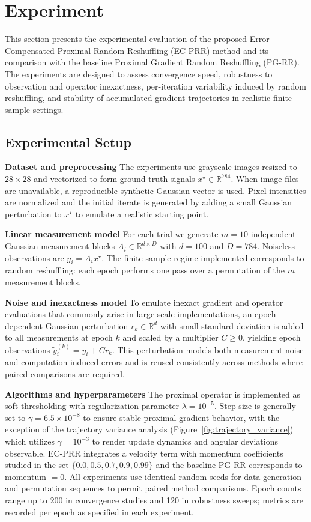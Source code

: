 \documentclass{article}
\begin{document}
\section*{Experiment}

This section presents the experimental evaluation of the proposed Error-Compensated Proximal Random Reshuffling (EC-PRR) method and its comparison with the baseline Proximal Gradient Random Reshuffling (PG-RR). The experiments are designed to assess convergence speed, robustness to observation and operator inexactness, per-iteration variability induced by random reshuffling, and stability of accumulated gradient trajectories in realistic finite-sample settings.

\subsection*{Experimental Setup}

\textbf{Dataset and preprocessing} The experiments use grayscale images resized to $28\times28$ and vectorized to form ground-truth signals $x^\star\in\mathbb{R}^{784}$. When image files are unavailable, a reproducible synthetic Gaussian vector is used. Pixel intensities are normalized and the initial iterate is generated by adding a small Gaussian perturbation to $x^\star$ to emulate a realistic starting point.

\textbf{Linear measurement model} For each trial we generate $m=10$ independent Gaussian measurement blocks $A_i\in\mathbb{R}^{d\times D}$ with $d=100$ and $D=784$. Noiseless observations are $y_i=A_i x^\star$. The finite-sample regime implemented corresponds to random reshuffling: each epoch performs one pass over a permutation of the $m$ measurement blocks.

\textbf{Noise and inexactness model} To emulate inexact gradient and operator evaluations that commonly arise in large-scale implementations, an epoch-dependent Gaussian perturbation $r_k\in\mathbb{R}^d$ with small standard deviation is added to all measurements at epoch $k$ and scaled by a multiplier $C\ge 0$, yielding epoch observations $\tilde{y}_i^{(k)}=y_i + C r_k$. This perturbation models both measurement noise and computation-induced errors and is reused consistently across methods where paired comparisons are required.

\textbf{Algorithms and hyperparameters} The proximal operator is implemented as soft-thresholding with regularization parameter $\lambda=10^{-5}$. Step-size is generally set to $\gamma=6.5\times10^{-8}$ to ensure stable proximal-gradient behavior, with the exception of the trajectory variance analysis (Figure~\ref{fig:trajectory_variance}) which utilizes $\gamma=10^{-3}$ to render update dynamics and angular deviations observable. EC-PRR integrates a velocity term with momentum coefficients studied in the set $\{0.0,0.5,0.7,0.9,0.99\}$ and the baseline PG-RR corresponds to momentum $=0$. All experiments use identical random seeds for data generation and permutation sequences to permit paired method comparisons. Epoch counts range up to 200 in convergence studies and 120 in robustness sweeps; metrics are recorded per epoch as specified in each experiment.
\end{document}
